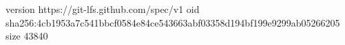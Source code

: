 version https://git-lfs.github.com/spec/v1
oid sha256:4cb1953a7c541bbcf0584e84ce543663abf03358d194bf199e9299ab05266205
size 43840
